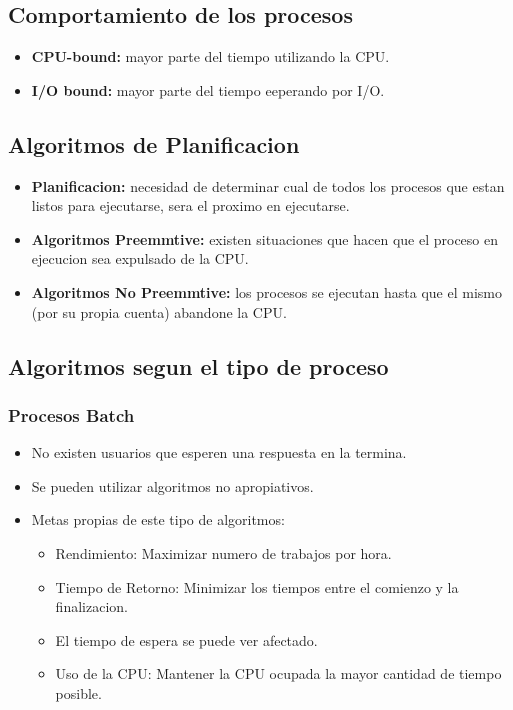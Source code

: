 \subsection{Comportamiento de los procesos}
\begin{itemize}
    \item \textbf{CPU-bound:} mayor parte del tiempo utilizando la CPU.
    \item \textbf{I/O bound:} mayor parte del tiempo eeperando por I/O.
\end{itemize}

\subsection{Algoritmos de Planificacion}
\begin{itemize}
    \item \textbf{Planificacion:} necesidad de determinar cual de todos los procesos que estan listos para ejecutarse, sera el proximo en ejecutarse.
    \item \textbf{Algoritmos Preemmtive:} existen situaciones que hacen que el proceso en ejecucion sea expulsado de la CPU.
    \item \textbf{Algoritmos No Preemmtive:} los procesos se ejecutan hasta que el mismo (por su propia cuenta) abandone la CPU.
\end{itemize}

\subsection{Algoritmos segun el tipo de proceso}
\subsubsection{Procesos Batch}
\begin{itemize}
    \item No existen usuarios que esperen una respuesta en la termina.
    \item Se pueden utilizar algoritmos no apropiativos.
    \item Metas propias de este tipo de algoritmos:
        \begin{itemize}
            \item Rendimiento: Maximizar  numero de trabajos por hora.
            \item Tiempo de Retorno: Minimizar los tiempos entre el comienzo y la finalizacion.
            \item El tiempo de espera se puede ver afectado.
            \item Uso de la CPU: Mantener la CPU ocupada la mayor cantidad de tiempo posible.
        \end{itemize}
\end{itemize}

